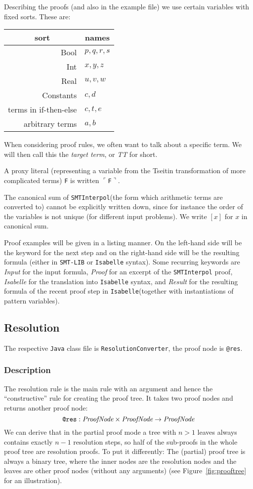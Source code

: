 \documentclass[10pt,a4paper]{article}
\newcommand{\si}{\texttt{SMTInterpol}\xspace}
\newcommand{\isa}{\texttt{Isabelle}\xspace}
\newcommand{\slib}{\texttt{SMT-LIB}\xspace}
\newcommand{\jav}{\texttt{Java}\xspace}
\newcommand{\ttt}{\texttt}
\newcommand{\TTx}{\emph{TT}}
\newcommand{\TT}{\TTx\xspace}
\newcommand{\proxy}[1]{\ensuremath{\ulcorner}#1\ensuremath{\urcorner}}
\newcommand{\cs}[1]{\ensuremath{[#1]}}
\begin{document}
Describing the proofs (and also in the example file) we use certain variables with fixed sorts. These are:
\begin{center}
	\begin{tabular}{r|l}
		\multicolumn{1}{c|}{sort} & \multicolumn{1}{c}{names} \\
		\hline
		Bool & $p, q, r, s$ \\
		Int & $x, y, z$ \\
		Real & $u, v, w$ \\
		Constants & $c, d$ \\
		terms in if-then-else & $c, t, e$ \\
		arbitrary terms & $a, b$
	\end{tabular}
\end{center}

When considering proof rules, we often want to talk about a specific term. We will then call this the \emph{target term}, or \TT for short.

A proxy literal (representing a variable from the Tseitin transformation of more complicated terms) \ttt{F} is written \proxy{\ttt{F}}.

The canonical sum of \si (the form which arithmetic terms are converted to) cannot be explicitly written down, since for instance the order of the variables is not unique (for different input problems). We write \cs{x} for $x$ in canonical sum.

Proof examples will be given in a listing manner. On the left-hand side will be the keyword for the next step and on the right-hand side will be the resulting formula (either in \slib or \isa syntax). Some recurring keywords are \emph{Input} for the input formula, \emph{Proof} for an excerpt of the \si proof, \emph{Isabelle} for the translation into \isa syntax, and \emph{Result} for the resulting formula of the recent proof step in \isa (together with instantiations of pattern variables).
%
\subsection{Resolution}\label{sec:res}
The respective \jav class file is \ttt{ResolutionConverter}, the proof node is \ttt{@res}.
%
\subsubsection*{Description}
The resolution rule is the main rule with an argument and hence the ``constructive'' rule for creating the proof tree. It takes two proof nodes and returns another proof node:
%
\begin{equation*}
	\ttt{@res}: \emph{ProofNode} \times \emph{ProofNode} \rightarrow \emph{ProofNode}
\end{equation*}
%
We can derive that in the partial proof mode a tree with $n > 1$ leaves always contains exactly $n - 1$ resolution steps, so half of the sub-proofs in the whole proof tree are resolution proofs. To put it differently: The (partial) proof tree is always a binary tree, where the inner nodes are the resolution nodes and the leaves are other proof nodes (without any arguments) (see Figure~\ref{fig:prooftree} for an illustration).
\end{document}
